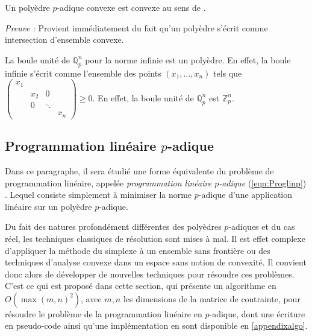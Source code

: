 \begin{propriete}
Un polyèdre $p$-adique convexe est convexe au sens de \cite{monna_ensembles_1958}.  
\end{propriete}

\textit{Preuve :} Provient immédiatement du fait qu'un polyèdre s'écrit comme intersection d'ensemble convexe.
\fi
\begin{ex}
	La boule unité de $\mathbb{Q}_{p}^n$ pour la norme infinie est un polyèdre. En effet, la boule infinie s'écrit comme l'ensemble des points $\left( x_1,\ldots,x_n \right)$ tels que $
	\begin{pmatrix} x_1 &  & & \\
		  & x_2 &0 &  \\
		&  0& \ddots & \\
		&  & & x_n
	\end{pmatrix} \ge 0$. En effet, la boule unité de $\mathbb{Q}_{p} ^n$ est $\mathbb{Z}_p^n$. %

\end{ex}

\subsection{Programmation linéaire \texorpdfstring{$p$-adique}{p-adique} } 
\label{sectionalgo} 
Dans ce paragraphe, il sera étudié une forme équivalente du problème de programmation linéaire, appelée \textit{programmation linéaire $p$-adique} (\ref{eqn:Proglinp}) . Lequel consiste simplement à minimiser la norme $p$-adique d'une application linéaire sur un polyèdre $p$-adique. 

	Du fait des natures profondément différentes des polyèdres $p$-adiques et du cas réel, les techniques classiques de résolution sont mises à mal. Il est effet complexe d'appliquer la méthode du simplexe à un ensemble sans frontière ou des techniques d'analyse convexe dans un espace sans notion de convexité. Il convient donc alors de développer de nouvelles techniques pour résoudre ces problèmes. C'est ce qui est proposé dans cette section, qui présente un algorithme en $O( \max\left( m,n \right)^2 )$, avec $m,n$ les dimensions de la matrice de contrainte, pour résoudre le problème de la programmation linéaire en $p$-adique, dont une écriture en pseudo-code ainsi qu'une implémentation en \sage sont disponible en \ref{appendixalgo}.

